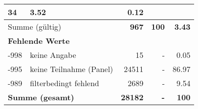 \begin{longtable}{lXrrr}
       \num{34} &
       \num[round-mode=places,round-precision=2]{3,52} &
         \num[round-mode=places,round-precision=2]{0,12} \\
     \midrule
     \multicolumn{2}{l}{Summe (gültig)} &
       \textbf{\num{967}} &
     \textbf{100} &
       \textbf{\num[round-mode=places,round-precision=2]{3,43}} \\
     \multicolumn{5}{l}{\textbf{Fehlende Werte}}\\
       -998 &
       keine Angabe &
         \num{15} &
        - &
         \num[round-mode=places,round-precision=2]{0,05} \\
       -995 &
       keine Teilnahme (Panel) &
         \num{24511} &
        - &
         \num[round-mode=places,round-precision=2]{86,97} \\
       -989 &
       filterbedingt fehlend &
         \num{2689} &
        - &
         \num[round-mode=places,round-precision=2]{9,54} \\
     \midrule
     \multicolumn{2}{l}{\textbf{Summe (gesamt)}} &
          \textbf{\num{28182}} &
        \textbf{-} &
        \textbf{100} \\
     \bottomrule
     \end{longtable}
     
